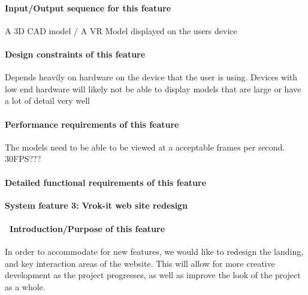 \documentclass[letterpaper, 10pt, draftclsnofoot, onecolumn]{IEEEtran}
\begin{document}
{\paragraph[Input/Output sequence for this
feature]{\rmfamily\bfseries\color{black}
Input/Output sequence for this feature}
{\color{black}
A 3D CAD model / A VR Model displayed on the users device  }

\paragraph[Design constraints of this
feature]{\rmfamily\bfseries\color{black} Design
constraints of this feature}
{\color{black}
Depends heavily on hardware on the device that the user is using. Devices with low end hardware will likely not be able to display models that are large or have a lot of detail very well  }

\paragraph[Performance requirements of this
feature]{\rmfamily\bfseries\color{black}
Performance requirements of this feature}
{\color{black}
The models need to be able to be viewed at a acceptable frames per second. 30FPS???  }

\paragraph[Detailed functional requirements of this
feature]{\rmfamily\bfseries\color{black}
Detailed functional requirements of this feature}


{\rmfamily\bfseries\color{black} System
feature 3: Vrok-it  web site redesign}
\paragraph[\ Introduction/Purpose of this
feature]{\foreignlanguage{english}{\ }\foreignlanguage{english}{Introduction/Purpose
of this feature}}
{\color{black}
In order to accommodate for new features, we would like to redesign the landing,
and key interaction areas of the website. This will allow for more creative development
as the project progresses, as well as improve the look of the project as a whole.}

}
\end{document}
